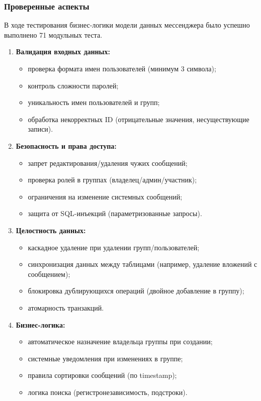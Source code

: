 \subsubsection{Проверенные аспекты}

В ходе тестирования бизнес-логики модели данных мессенджера было успешно выполнено 71 модульных теста.

\begin{enumerate}
	\item \textbf{Валидация входных данных:}
	\begin{itemize}
		\item проверка формата имен пользователей (минимум 3 символа);
		\item контроль сложности паролей;
		\item уникальность имен пользователей и групп;
		\item обработка некорректных ID (отрицательные значения, несуществующие записи).
	\end{itemize}
	
	\item \textbf{Безопасность и права доступа:}
	\begin{itemize}
		\item запрет редактирования/удаления чужих сообщений;
		\item проверка ролей в группах (владелец/админ/участник);
		\item ограничения на изменение системных сообщений;
		\item защита от SQL-инъекций (параметризованные запросы).
	\end{itemize}
	
	\item \textbf{Целостность данных:}
	\begin{itemize}
		\item каскадное удаление при удалении групп/пользователей;
		\item синхронизация данных между таблицами (например, удаление вложений с сообщением);
		\item блокировка дублирующихся операций (двойное добавление в группу);
		\item атомарность транзакций.
	\end{itemize}
	
	\item \textbf{Бизнес-логика:}
	\begin{itemize}
		\item автоматическое назначение владельца группы при создании;
		\item системные уведомления при изменениях в группе;
		\item правила сортировки сообщений (по timestamp);
		\item логика поиска (регистронезависимость, подстроки).
	\end{itemize}
	

\end{enumerate}
